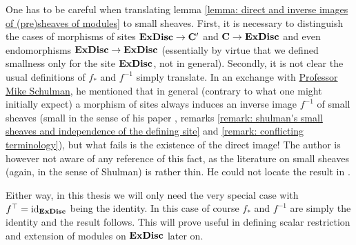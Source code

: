 \begin{remark}
	\label{remark: direct and inverse images of (pre)sheaves of modules}
	
	One has to be careful when translating lemma \ref{lemma: direct and inverse images of (pre)sheaves of modules} to small sheaves. First, it is necessary to distinguish the cases of morphisms of sites ${\mathbf{ExDisc}}\to{{\mathbf{C'}}}$ and ${{\mathbf{C}}} \to {\mathbf{ExDisc}}$ and even endomorphisms ${\mathbf{ExDisc}} \to {\mathbf{ExDisc}}$ (essentially by virtue that we defined smallness only for the site ${\mathbf{ExDisc}}$, not in general). Secondly, it is not clear the usual definitions of $f_\ast$ and $f^{-1}$ simply translate. In an exchange with \href{https://home.sandiego.edu/~shulman/}{Professor Mike Schulman}, he mentioned that in general (contrary to what one might initially expect) a morphism of sites always induces an inverse image $f^{-1}$ of small sheaves (small in the sense of his paper \cite{shulman2012exactcompletionssmallsheaves}, \confer remarks \ref{remark: shulman's small sheaves and independence of the defining site} and \ref{remark: conflicting terminology}), but what fails is the existence of the direct image! The author is however not aware of any reference of this fact, as the literature on small sheaves (again, in the sense of Shulman) is rather thin. He could not locate the result in \eg \cite{shulman2012exactcompletionssmallsheaves}.
	
	Either way, in this thesis we will only need the very special case with $f^\top = \mathrm{id}_{\mathbf{ExDisc}}$ being the identity. In this case of course $f_\ast$ and $f^{-1}$ are simply the identity and the result follows. This will prove useful in defining scalar restriction and extension of modules on ${\mathbf{ExDisc}}$ later on.
\end{remark}

